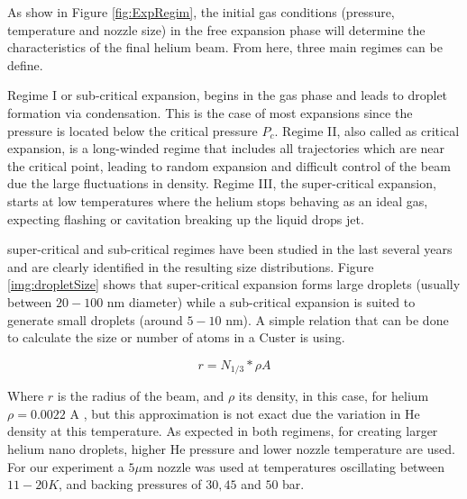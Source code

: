 As show in Figure \ref{fig:ExpRegim}, the initial gas conditions (pressure, temperature and nozzle size) in the free expansion phase will determine the characteristics of the final helium beam. From here, three main regimes can be define.

Regime I or sub-critical expansion, begins in the gas phase and leads to droplet formation via condensation. This is the case of most expansions since the pressure is located below the critical pressure $P_{c}$.
Regime II, also called as critical expansion, is a long-winded regime that includes all trajectories which are near the critical point, leading to random expansion and difficult control of the beam due the large fluctuations in density.
Regime III, the super-critical expansion, starts at low temperatures where the helium stops behaving as an ideal gas, expecting flashing or cavitation  breaking up the liquid drops jet. \cite{buchenau_mass_1990}

super-critical and sub-critical regimes have been studied  in the last several years and  are clearly identified in the resulting size distributions. Figure \ref{img:dropletSize} shows that super-critical expansion forms large droplets (usually between $20-100$ nm diameter) while a sub-critical expansion is suited to generate small droplets (around $5-10$ nm).  A simple relation that can be done to calculate the size or number of atoms in a Custer is using. 

\begin{equation}
r=N_{1/3} * \rho A
\end{equation}

Where $r$ is the radius of the beam, and $\rho$ its density, in this case, for helium $\rho =0.0022$ A  \cite{stringari_systematics_1987}, but this approximation is not exact due the variation in He density at this temperature. As expected in both regimens, for creating larger helium nano droplets, higher He pressure and lower nozzle temperature are used. For our experiment a $5 \mu$m nozzle was used at temperatures oscillating between $11-20 K$, and backing pressures of $30, 45 $ and $ 50$ bar.

